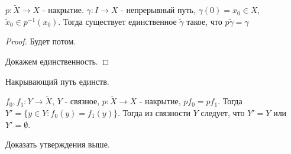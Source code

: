 \begin{theorem}
    $p: \tilde{X} \rightarrow X$ - накрытие. $\gamma: I \rightarrow X$ - непрерывный путь, $\gamma(0) = x_0 \in X$, $\tilde{x}_0 \in p^{-1}(x_0)$. Тогда существует единственное $\tilde{\gamma}$ такое, что $p \tilde{\gamma} = \gamma$
\end{theorem}
\begin{proof}
    Будет потом.

    Докажем единственность.
\end{proof}

\begin{statement}
    Накрывающий путь единств.
\end{statement}

\begin{statement}
    $f_0, f_1: Y \rightarrow \tilde{X}$, $Y$ - связное, $p: \tilde{X} \rightarrow X$ - накрытие, $p f_0 = p f_1$. Тогда $Y' = \{y \in Y : f_0(y) = f_1(y)\}$.
    Тогда из связности $Y$ следует, что $Y' = Y$ или $Y' = \emptyset$.
\end{statement}

\begin{exercise}
    Доказать утверждения выше.
\end{exercise}

\begin{theorem}

\end{theorem}